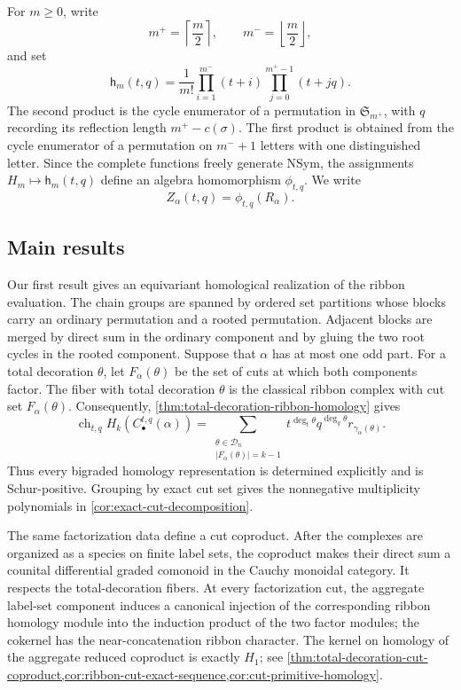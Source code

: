 \documentclass{amsart}
\theoremstyle{definition}
\theoremstyle{remark}
\newcommand{\NSym}{\mathrm{NSym}}
\begin{document}
For $m\geq0$, write
\[
 m^+=\left\lceil\frac m2\right\rceil,
 \qquad m^-=\left\lfloor\frac m2\right\rfloor,
\]
and set
\[
 \mathsf h_m(t,q)
 =\frac1{m!}
   \prod_{i=1}^{m^-}(t+i)
   \prod_{j=0}^{m^+-1}(t+jq).
\]
The second product is the cycle enumerator of a permutation in
$\mathfrak S_{m^+}$, with $q$ recording its reflection length
$m^+-c(\sigma)$.  The first product is obtained from the cycle enumerator of a
permutation on $m^-+1$ letters with one distinguished letter.  Since the
complete functions freely generate $\NSym$, the assignments
$H_m\mapsto\mathsf h_m(t,q)$ define an algebra homomorphism $\phi_{t,q}$.
We write
\[
 Z_\alpha(t,q)=\phi_{t,q}(R_\alpha).
\]

\subsection*{Main results}

Our first result gives an equivariant homological realization of the ribbon
evaluation.  The chain groups are spanned by ordered set partitions whose
blocks carry an ordinary permutation and a rooted permutation.  Adjacent
blocks are merged by direct sum in the ordinary component and by gluing the
two root cycles in the rooted component.  Suppose that $\alpha$ has at most
one odd part.  For a total decoration $\theta$, let $F_\alpha(\theta)$ be the
set of cuts at which both components factor.  The fiber with total decoration
$\theta$ is the classical ribbon complex with cut set $F_\alpha(\theta)$.
Consequently, \cref{thm:total-decoration-ribbon-homology} gives
\begin{equation}
 \operatorname{ch}_{t,q}H_k(C_\bullet^{t,q}(\alpha))
 =\sum_{\substack{\theta\in\mathcal D_n\\
                   |F_\alpha(\theta)|=k-1}}
 t^{\deg_t\theta}q^{\deg_q\theta}r_{\gamma_\alpha(\theta)}.
 \label{eq:intro-homology-formula}
\end{equation}
Thus every bigraded homology representation is determined explicitly and is
Schur-positive.  Grouping by exact cut set gives the nonnegative multiplicity
polynomials in \cref{cor:exact-cut-decomposition}.

The same factorization data define a cut coproduct.  After the complexes are
organized as a species on finite label sets, the coproduct makes their direct
sum a counital differential graded comonoid in the Cauchy monoidal category.
It respects the total-decoration fibers.  At every factorization cut, the
aggregate label-set component induces a canonical injection of the
corresponding ribbon homology module into the induction product of the two
factor modules; the cokernel has the near-concatenation ribbon character.
The kernel on homology of the aggregate reduced coproduct is exactly $H_1$;
see
\cref{thm:total-decoration-cut-coproduct,cor:ribbon-cut-exact-sequence,cor:cut-primitive-homology}.
\end{document}
